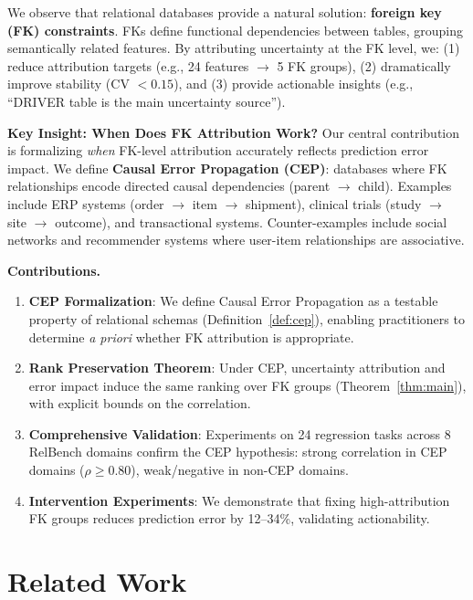 \documentclass{article}
\begin{document}
We observe that relational databases provide a natural solution: \textbf{foreign key (FK)
constraints}. FKs define functional dependencies between tables, grouping semantically
related features. By attributing uncertainty at the FK level, we:
(1) reduce attribution targets (e.g., 24 features $\to$ 5 FK groups),
(2) dramatically improve stability (CV $< 0.15$), and
(3) provide actionable insights (e.g., ``DRIVER table is the main uncertainty source'').

\textbf{Key Insight: When Does FK Attribution Work?}
Our central contribution is formalizing \emph{when} FK-level attribution accurately
reflects prediction error impact. We define \textbf{Causal Error Propagation (CEP)}:
databases where FK relationships encode directed causal dependencies (parent $\to$ child).
Examples include ERP systems (order $\to$ item $\to$ shipment), clinical trials
(study $\to$ site $\to$ outcome), and transactional systems. Counter-examples include
social networks and recommender systems where user-item relationships are associative.

\textbf{Contributions.}
\begin{enumerate}
    \item \textbf{CEP Formalization}: We define Causal Error Propagation as a testable
    property of relational schemas (Definition~\ref{def:cep}), enabling practitioners
    to determine \emph{a priori} whether FK attribution is appropriate.

    \item \textbf{Rank Preservation Theorem}: Under CEP, uncertainty attribution and
    error impact induce the same ranking over FK groups (Theorem~\ref{thm:main}),
    with explicit bounds on the correlation.

    \item \textbf{Comprehensive Validation}: Experiments on 24 regression tasks across
    8 RelBench domains confirm the CEP hypothesis: strong correlation in CEP domains
    ($\rho \geq 0.80$), weak/negative in non-CEP domains.

    \item \textbf{Intervention Experiments}: We demonstrate that fixing high-attribution
    FK groups reduces prediction error by 12--34\%, validating actionability.
\end{enumerate}

\section{Related Work}
\label{sec:related}
\end{document}
